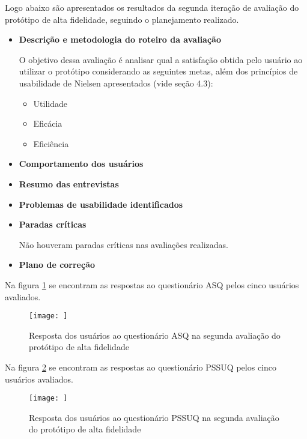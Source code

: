   Logo abaixo são apresentados os resultados da segunda iteração de avaliação do protótipo de alta fidelidade,
  seguindo o planejamento realizado.
  
  \begin{itemize}
    \item \textbf{Descrição e metodologia do roteiro da avaliação}
    
    \subitem O objetivo dessa avaliação é analisar qual a satisfação obtida pelo usuário ao utilizar o protótipo 
    considerando as seguintes metas, além dos princípios de usabilidade de Nielsen apresentados (vide seção 4.3):
    
    \begin{itemize}
      \item Utilidade
      \item Eficácia
      \item Eficiência
    \end{itemize}
    
    \item \textbf{Comportamento dos usuários}
    
      \subitem 
    
    \item \textbf{Resumo das entrevistas}
    
      \subitem 
	    
    \item \textbf{Problemas de usabilidade identificados}
    
      \subitem 
          
    \item \textbf{Paradas críticas}
    
      \subitem Não houveram paradas críticas nas avaliações realizadas.
    
    \item \textbf{Plano de correção}
    
      \subitem 
    
  \end{itemize}
  
  Na figura \ref{asqalta_2} se encontram as respostas ao questionário ASQ pelos cinco usuários avaliados.
  
  \begin{figure}[!htb]
  \centering
  \texttt{[image: ]}
  \caption{Resposta dos usuários ao questionário ASQ na segunda avaliação do protótipo de alta fidelidade}
  \label{asqalta_2}
  \end{figure}
  
  Na figura \ref{pssuqalta_2} se encontram as respostas ao questionário PSSUQ pelos cinco usuários avaliados.
  
  \begin{figure}[!htb]
  \centering
  \texttt{[image: ]}
  \caption{Resposta dos usuários ao questionário PSSUQ na segunda avaliação do protótipo de alta fidelidade}
  \label{pssuqalta_2}
  \end{figure}  